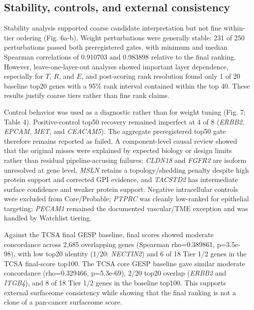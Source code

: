 \documentclass[twocolumn]{article}
\begin{document}
\subsection{Stability, controls, and external consistency}

Stability analysis supported coarse candidate interpretation but not fine within-tier ordering (Fig. 6a-b). Weight perturbations were generally stable: 231 of 250 perturbations passed both preregistered gates, with minimum and median Spearman correlations of 0.910703 and 0.983898 relative to the final ranking. However, leave-one-layer-out analyses showed important layer dependence, especially for $T$, $R$, and $E$, and post-scoring rank resolution found only 1 of 20 baseline top20 genes with a 95\% rank interval contained within the top 40. These results justify coarse tiers rather than fine rank claims.

Control behavior was used as a diagnostic rather than for weight tuning (Fig. 7; Table 4). Positive-control top50 recovery remained imperfect at 4 of 8 (\textit{ERBB2}, \textit{EPCAM}, \textit{MET}, and \textit{CEACAM5}). The aggregate preregistered top50 gate therefore remains reported as failed. A component-level causal review showed that the original misses were explained by expected biology or design limits rather than residual pipeline-accusing failures: \textit{CLDN18} and \textit{FGFR2} are isoform unresolved at gene level, \textit{MSLN} retains a topology/\allowbreak{}shedding penalty despite high protein support and corrected GPI evidence, and \textit{TACSTD2} has intermediate surface confidence and weaker protein support. Negative intracellular controls were excluded from Core/\allowbreak{}Probable; \textit{PTPRC} was cleanly low-ranked for epithelial targeting; \textit{PECAM1} remained the documented vascular/\allowbreak{}TME exception and was handled by Watchlist tiering.

Against the TCSA final GESP baseline, final scores showed moderate concordance across 2,685 overlapping genes (Spearman rho=0.389861, p=3.5e-98), with low top20 identity (1/\allowbreak{}20: \textit{NECTIN2}) and 6 of 18 Tier 1/\allowbreak{}2 genes in the TCSA final-score top100. The TCSA core GESP baseline gave similar moderate concordance (rho=0.329466, p=5.3e-69), 2/\allowbreak{}20 top20 overlap (\textit{ERBB2} and \textit{ITGB4}), and 8 of 18 Tier 1/\allowbreak{}2 genes in the baseline top100. This supports external surfaceome consistency while showing that the final ranking is not a clone of a pan-cancer surfaceome score.
\end{document}
